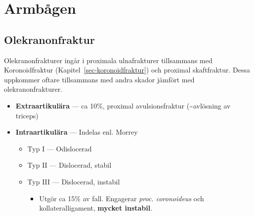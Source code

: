 \documentclass[
  letterpaper,
  DIV=11,
  numbers=noendperiod]{scrreport}
\providecommand{\tightlist}{%
  \setlength{\itemsep}{0pt}\setlength{\parskip}{0pt}}\usepackage{longtable,booktabs,array}
\begin{document}
\hypertarget{armbuxe5gen}{%
\section{Armbågen}\label{armbuxe5gen}}

\hypertarget{sec-olekranonfraktur}{%
\subsection{Olekranonfraktur}\label{sec-olekranonfraktur}}

Olekranonfrakturer ingår i proximala ulnafrakturer tillsammans med
Koronoidfraktur (Kapitel~\ref{sec-koronoidfraktur}) och proximal
skaftfraktur. Dessa uppkommer oftare tillsammans med andra skador
jämfört med olekranonfrakturer.

\begin{tcolorbox}[enhanced jigsaw, colback=white, colbacktitle=quarto-callout-tip-color!10!white, toptitle=1mm, arc=.35mm, toprule=.15mm, rightrule=.15mm, titlerule=0mm, breakable, bottomrule=.15mm, colframe=quarto-callout-tip-color-frame, left=2mm, opacityback=0, coltitle=black, title=\textcolor{quarto-callout-tip-color}{\faLightbulb}\hspace{0.5em}{Klassifikation}, leftrule=.75mm, bottomtitle=1mm, opacitybacktitle=0.6]

\begin{itemize}
\tightlist
\item
  \textbf{Extraartikulära} --- ca 10\%, proximal avulsionsfraktur
  (\textasciitilde avlösning av triceps)
\item
  \textbf{Intraartikulära} --- Indelas enl. Morrey

  \begin{itemize}
  \tightlist
  \item
    Typ I --- Odislocerad
  \item
    Typ II --- Dislocerad, stabil
  \item
    Typ III --- Dislocerad, instabil

    \begin{itemize}
    \tightlist
    \item
      Utgör ca 15\% av fall. Engagerar \emph{proc. coronoideus} och
      kollateralligament, \textbf{mycket instabil}.
    \end{itemize}
  \end{itemize}
\end{itemize}

\end{tcolorbox}
\end{document}
